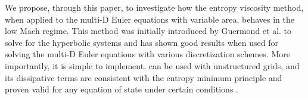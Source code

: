 We propose, through this paper, to investigate how the entropy viscosity method, when applied to the multi-D Euler equations with variable area, behaves in the low Mach regime. This method was initially introduced by Guermond et al. to solve for the hyperbolic systems and has shown good results when used for solving the multi-D Euler equations with various discretization schemes. More importantly, it is simple to implement, can be used with unstructured grids,  and its dissipative terms are consistent with the entropy minimum principle and proven valid for any equation of state under certain conditions \cite{jlg}. \\



